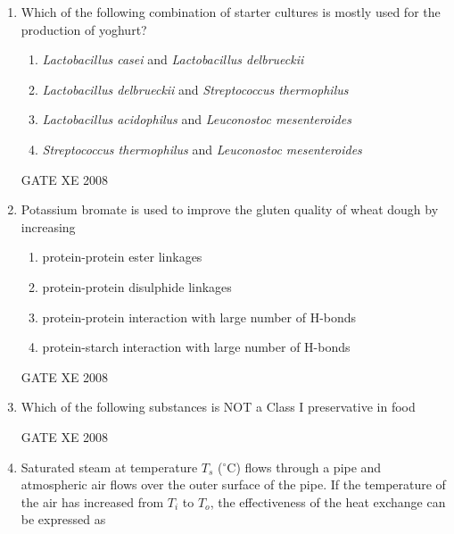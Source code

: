 \documentclass[12pt]{article}
\begin{document}
\begin{enumerate}
    \item Which of the following combination of starter cultures is mostly used for the production of yoghurt? 

\begin{enumerate}
    \item  \textit{Lactobacillus casei} and \textit{Lactobacillus delbrueckii} 
    \item  \textit{Lactobacillus delbrueckii} and \textit{Streptococcus thermophilus} 
    \item  \textit{Lactobacillus acidophilus} and \textit{Leuconostoc mesenteroides} 
    \item  \textit{Streptococcus thermophilus} and \textit{Leuconostoc mesenteroides} 
\end{enumerate}
    
    GATE XE 2008

    \item Potassium bromate is used to improve the gluten quality of wheat dough by increasing 

\begin{enumerate}
\item  protein-protein ester linkages 
\item  protein-protein disulphide linkages 
\item  protein-protein interaction with large number of H-bonds 
\item  protein-starch interaction with large number of H-bonds 
\end{enumerate}
    
    GATE XE 2008

    \item Which of the following substances is NOT a Class I preservative in food 

\begin{enumerate}
\end{enumerate}
    
    GATE XE 2008

    \item Saturated steam at temperature $T_s$ ($^\circ$C) flows through a pipe and atmospheric air flows over the outer surface of the pipe. If the temperature of the air has increased from $T_i$ to $T_o$, the effectiveness of the heat exchange can be expressed as 


\end{enumerate}
\end{document}
